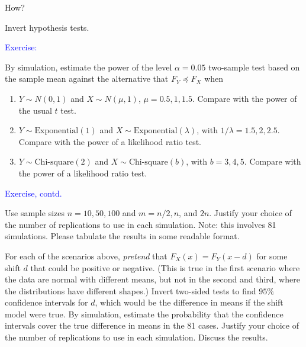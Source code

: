 \documentclass[landscape]{slides}
\begin{document}
\begin{slide}
\begin{slide}
How?

Invert hypothesis tests.

\end{slide}


\begin{slide}
{\textcolor{blue}{Exercise:}}

By simulation, estimate the power of the level $\alpha = 0.05$
two-sample test based on the sample mean
against the alternative that $F_Y \preceq F_X$
when
\begin{enumerate}
    \item $Y \sim N(0, 1)$ and $X \sim N(\mu, 1)$, $\mu = 0.5, 1, 1.5$.  Compare with
             the power of the usual $t$ test.
   \item $Y \sim \mbox{Exponential}(1)$ and $X \sim  \mbox{Exponential}(\lambda)$,
            with $1/\lambda = 1.5, 2, 2.5$.
            Compare with the power of a likelihood ratio test.
   \item $Y \sim \mbox{Chi-square}(2)$  and $X \sim \mbox{Chi-square}(b)$, with $b = 3, 4, 5$.
            Compare with the power of a likelihood ratio test.
\end{enumerate}

\end{slide}


\begin{slide}
{\textcolor{blue}{Exercise, contd.}}

Use sample sizes $n = 10, 50, 100$ and $m = n/2, n$, and $2n$.
Justify your choice of the number of replications to use in each simulation.
Note: this involves 81 simulations.  Please tabulate the results in some readable format.

For each of the scenarios above,  {\em pretend\/} that $F_X(x) = F_Y(x-d)$ for some shift
$d$ that could be positive or negative. 
(This is true in the first scenario where the data are normal with different means, but not
in the second and third, where the distributions have different shapes.)
Invert two-sided tests to find $95\%$ confidence intervals for $d$, which would
be the difference in means if the shift model were true.
By simulation, estimate the probability that the confidence intervals cover
the true difference in means in the 81 cases.
Justify your choice of the number of replications to use in each simulation.
Discuss the results.


\end{slide}
\end{slide}
\end{document}
